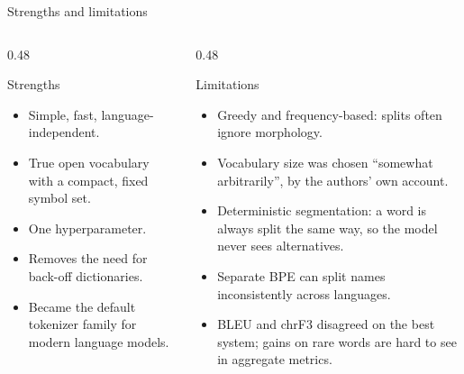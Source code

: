 \documentclass[aspectratio=169,11pt]{beamer}
\begin{document}
\begin{frame}{Strengths and limitations}
  \begin{columns}[T]
    \begin{column}{0.48\textwidth}
      \begin{exampleblock}{Strengths}
        \small
        \begin{itemize}
          \item Simple, fast, language-independent.
          \item True open vocabulary with a compact, fixed symbol set.
          \item One hyperparameter.
          \item Removes the need for back-off dictionaries.
          \item Became the default tokenizer family for modern language models.
        \end{itemize}
      \end{exampleblock}
    \end{column}
    \begin{column}{0.48\textwidth}
      \begin{alertblock}{Limitations}
        \small
        \begin{itemize}
          \item Greedy and frequency-based: splits often ignore morphology.
          \item Vocabulary size was chosen ``somewhat arbitrarily'', by the authors' own account.
          \item Deterministic segmentation: a word is always split the same way, so the model never sees alternatives.
          \item Separate BPE can split names inconsistently across languages.
          \item BLEU and chrF3 disagreed on the best system; gains on rare words are hard to see in aggregate metrics.
        \end{itemize}
      \end{alertblock}
    \end{column}
  \end{columns}
\end{frame}
\end{document}
